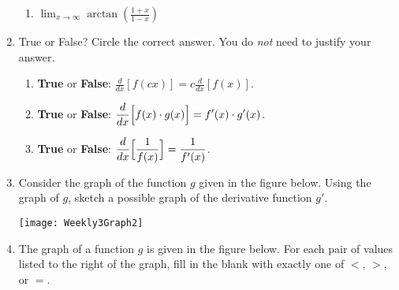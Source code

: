 \documentclass[11pt]{article}
\theoremstyle{definition}
\theoremstyle{definition}
\newcommand{\ds}{\displaystyle}
\begin{document}
\begin{enumerate}
\begin{enumerate}
\item $\displaystyle \lim_{x\to \infty}\arctan\left(\frac{1+x}{1-x}\right)$

\end{enumerate}

\newpage

\item True or False? Circle the correct answer. You do \emph{not} need to justify your answer.

\begin{enumerate}


\item \textbf{True} or \textbf{False}: $\displaystyle \frac{d}{dx}[f(cx)]=c\frac{d}{dx}[f(x)]$.

\item \textbf{True} or \textbf{False}: $\displaystyle \frac{d}{dx}\Bigl[f(x)\cdot g(x)\Bigr]=f'(x)\cdot g'(x)$.

\item \textbf{True} or \textbf{False}: $\displaystyle \frac{d}{dx}\Bigl[\frac{1}{f(x)}\Bigr]=\frac{1}{f'(x)}$.

\end{enumerate}	

\item Consider the graph of the function $g$ given in the figure below. Using the graph of $g$, sketch a possible graph of the derivative function $g'$.
\begin{center}
\texttt{[image: Weekly3Graph2]}	
\end{center}

\item The graph of a function $g$ is given in the figure below. For each pair of values listed to the right of the graph, fill in the blank with exactly one of $<$, $>$, or $=$.


\end{enumerate}
\end{document}
